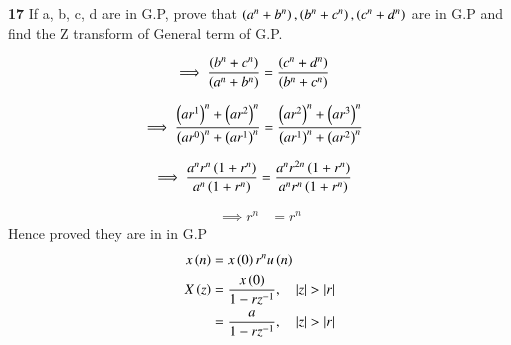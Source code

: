 \documentclass[journal,12pt,twocolumn]{IEEEtran}
\theoremstyle{remark}
\begin{document}


\vspace{3cm}

\title{}
\author{EE23BTECH11047 - Deepakreddy P
}
\maketitle
\newpage
\bigskip

\noindent \textbf{17} \quad 
If a, b, c, d are in G.P, prove that 
$ \left(a^{n} + b^{n}\right),\left(b^{n} + c^{n}\right),\left(c^{n} + d^{n}\right) $ are in G.P and find the Z transform of General term of G.P.\\
\solution

\begin{center}

    \begin{table}[ht]
        
    \end{table}
\end{center}

\begin{align} \implies \frac{\left(b^n + c^n\right)}{\left(a^n + b^n\right)} &= \frac{\left(c^n + d^n\right)}{\left(b^n + c^n\right)} \end{align}

\begin{align} \implies \frac{\left(ar^1\right)^n + \left(ar^2\right)^n}{\left(ar^0\right)^n + \left(ar^1\right)^n}  &= \frac{\left(ar^2\right)^n + \left(ar^3\right)^n}{\left(ar^1\right)^n + \left(ar^2\right)^n} \end{align}

\begin{align} \implies \frac{a^n r^n \left(1 + r^n\right)}{a^n \left(1 + r^n\right)} &= \frac{a^n r^{2n} \left(1 + r^n\right)}{a^n r^n \left(1 + r^n\right)} \end{align}

\begin{align} \implies r^n &= r^n \end{align}
Hence proved they are in in G.P
\begin{align}
    x\brak{n} &= x\brak{0}r^{n} u\brak{n}\\
    X\brak{z} &= \frac{x\brak{0}}{1-rz^{-1}}, \quad |z|>|r|\\
    &= \frac{a}{1-rz^{-1}}, \quad |z|>|r|
\end{align}
\end{document}
